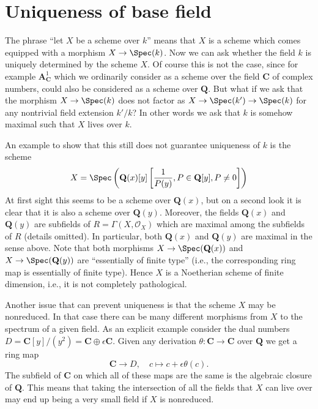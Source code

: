 \section{Uniqueness of base field}
\label{section-base-field}

\noindent
The phrase ``let $X$ be a scheme over $k$'' means that $X$ is a scheme
which comes equipped with a morphism $X \to \Spec(k)$. Now we can
ask whether the field $k$ is uniquely determined by the scheme $X$.
Of course this is not the case, since for example
$\mathbf{A}^1_{\mathbf{C}}$ which we ordinarily consider as a scheme
over the field $\mathbf{C}$ of complex numbers, could also be considered
as a scheme over $\mathbf{Q}$. But what if we ask that the morphism
$X \to \Spec(k)$ does not factor as
$X \to \Spec(k') \to \Spec(k)$ for any nontrivial field
extension $k'/k$? In other words we ask that $k$ is
somehow maximal such that $X$ lives over $k$.

\medskip\noindent
An example to show that this still does not guarantee uniqueness of $k$
is the scheme
$$
X =
\Spec\left(
\mathbf{Q}(x)[y]\left[\frac{1}{P(y)}, P \in \mathbf{Q}[y], P \not = 0\right]
\right)
$$
At first sight this seems to be a scheme over $\mathbf{Q}(x)$, but on a
second look it is clear that it is also a scheme over $\mathbf{Q}(y)$.
Moreover, the fields $\mathbf{Q}(x)$ and $\mathbf{Q}(y)$ are subfields
of $R = \Gamma(X, \mathcal{O}_X)$ which are maximal among the subfields
of $R$ (details omitted). In particular, both $\mathbf{Q}(x)$ and
$\mathbf{Q}(y)$ are maximal in the sense above. Note that both morphisms
$X \to \Spec(\mathbf{Q}(x))$
and $X \to \Spec(\mathbf{Q}(y))$ are ``essentially of finite type''
(i.e., the corresponding ring map is essentially of finite type).
Hence $X$ is a Noetherian scheme of finite dimension, i.e., it is
not completely pathological.

\medskip\noindent
Another issue that can prevent uniqueness is that the scheme $X$ may
be nonreduced. In that case there can be many different morphisms
from $X$ to the spectrum of a given field. As an explicit example consider
the dual numbers
$D = \mathbf{C}[y]/(y^2) = \mathbf{C} \oplus \epsilon \mathbf{C}$.
Given any derivation $\theta : \mathbf{C} \to \mathbf{C}$ over $\mathbf{Q}$
we get a ring map
$$
\mathbf{C} \longrightarrow D, \quad
c \longmapsto c + \epsilon \theta(c).
$$
The subfield of $\mathbf{C}$ on which all of these maps are the same
is the algebraic closure of $\mathbf{Q}$. This means that taking the
intersection of all the fields that $X$ can live over may end up
being a very small field if $X$ is nonreduced.

